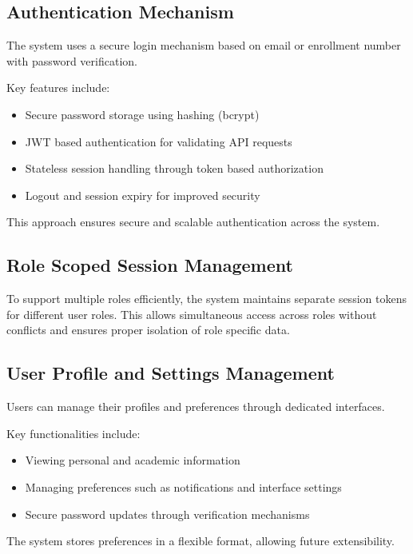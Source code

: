 \subsection{Authentication Mechanism}

The system uses a secure login mechanism based on email or enrollment number with password
verification.

Key features include:

\begin{itemize}
    \item Secure password storage using hashing (bcrypt)
    \item JWT based authentication for validating API requests
    \item Stateless session handling through token based authorization
    \item Logout and session expiry for improved security
\end{itemize}

This approach ensures secure and scalable authentication across the system.

\subsection{Role Scoped Session Management}

To support multiple roles efficiently, the system maintains separate session tokens for different user
roles. This allows simultaneous access across roles without conflicts and ensures proper isolation of
role specific data.

\subsection{User Profile and Settings Management}

Users can manage their profiles and preferences through dedicated interfaces.

Key functionalities include:

\begin{itemize}
    \item Viewing personal and academic information
    \item Managing preferences such as notifications and interface settings
    \item Secure password updates through verification mechanisms
\end{itemize}

The system stores preferences in a flexible format, allowing future extensibility.

